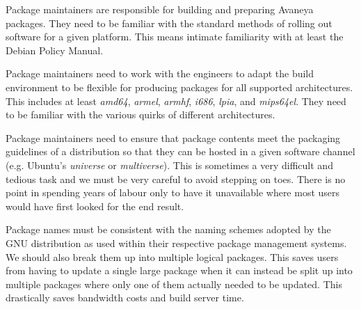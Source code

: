 
Package maintainers are responsible for building and preparing Avaneya packages. They need to be familiar with the standard methods of rolling out software for a given platform. This means intimate familiarity with at least the Debian Policy Manual.

Package maintainers need to work with the engineers to adapt the build environment to be flexible for producing packages for all supported architectures. This includes at least {\it amd64}, {\it armel}, {\it armhf}, {\it i686}, {\it lpia}, and {\it mips64el}. They need to be familiar with the various quirks of different architectures.

Package maintainers need to ensure that package contents meet the packaging guidelines of a distribution so that they can be hosted in a given software channel (e.g. Ubuntu's {\it universe} or {\it multiverse}). This is sometimes a very difficult and tedious task and we must be very careful to avoid stepping on toes. There is no point in spending years of labour only to have it unavailable where most users would have first looked for the end result.

Package names must be consistent with the naming schemes adopted by the GNU distribution as used within their respective package management systems. We should also break them up into multiple logical packages. This saves users from having to update a single large package when it can instead be split up into multiple packages where only one of them actually needed to be updated. This drastically saves bandwidth costs and build server time.



\StopChapter

